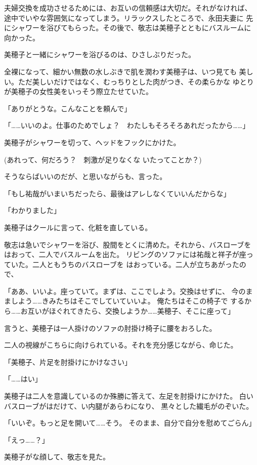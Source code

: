 ﻿\documentclass[
    book,tate,
    line_length=30zw,
    jafontsize=12pt,
    paper=b5j,
    landscape,
    ]{jlreq}
\begin{document}
夫婦交換を成功させるためには、お互いの信頼感は大切だ。それがなければ、
途中でいやな雰囲気になってしまう。リラックスしたところで、永田夫妻に
先にシャワーを浴びてもらった。その後で、敬志は美穂子とともにバスルームに
向かった。

美穂子と一緒にシャワーを浴びるのは、ひさしぶりだった。

全裸になって、細かい無数の水しぶきで肌を潤わす美穂子は、いつ見ても
美しい。ただ美しいだけではなく、むっちりとした肉がつき、その柔らかな
ゆとりが美穂子の女性美をいっそう際立たせていた。

「ありがとうな。こんなことを頼んで」

「……いいのよ。仕事のためでしょ？　わたしもそろそろあれだったから……」

美穂子がシャワーを切って、ヘッドをフックにかけた。

(あれって、何だろう？　刺激が足りなくな いたってことか？)

そうならばいいのだが、と思いながらも、言った。

「もし祐哉がいまいちだったら、最後はアレしなくていいんだからな」

「わかりました」

美穂子はクールに言って、化粧を直している。

敬志は急いでシャワーを浴び、股間をとくに清めた。それから、バスローブを
はおって、二人でバスルームを出た。
リビングのソファには祐哉と祥子が座っていた。二人ともうちのバスローブを
はおっている。二人が立ちあがったので、

「ああ、いいよ。座っていて。まずは、ここでしよう。交換はせずに、
今のまましよう……きみたちはそこでしていていいよ。 俺たちはそこの椅子で
するから……お互いがほぐれてきたら、交換しようか……美穂子、そこに座って」

言うと、美穂子は一人掛けのソファの肘掛け椅子に腰をおろした。

二人の視線がこちらに向けられている。それを充分感じながら、命じた。

「美穂子、片足を肘掛けにかけなさい」

「……はい」

美穂子は二人を意識しているのか殊勝に答えて、左足を肘掛けにかけた。
白いバスローブがはだけて、い内腿があらわになり、
黒々とした繊毛がのぞいた。

「いいぞ。もっと足を開いて……そう。 そのまま、自分で自分を慰めてごらん」

「えっ……？」

美穂子がな顔して、敬志を見た。
\end{document}
